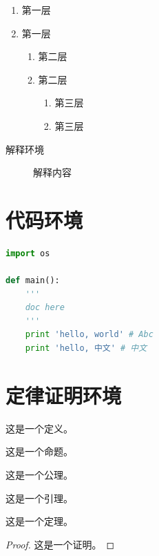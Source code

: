 {\begin{enumerate}
    \item 第一层\label{item:1}
    \item 第一层
    \begin{enumerate}
        \item 第二层\label{item:2}
        \item 第二层
        \begin{enumerate}
            \item 第三层\label{item:3}
            \item 第三层
        \end{enumerate}
    \end{enumerate}
\end{enumerate}

\begin{description}
    \item[解释环境]  解释内容
\end{description}



\clearpage

\section{代码环境}

\begin{lstlisting}[language=python]
import os

def main():
    '''
    doc here
    '''
    print 'hello, world' # Abc
    print 'hello, 中文' # 中文
\end{lstlisting}

\section{定律证明环境}

\begin{definition}
这是一个定义。
\end{definition}
\begin{proposition}
这是一个命题。
\end{proposition}
\begin{axiom}
这是一个公理。
\end{axiom}
\begin{lemma}
这是一个引理。
\end{lemma}

\begin{theorem}
这是一个定理。
\end{theorem}
\begin{proof}
这是一个证明。
\end{proof}

}
